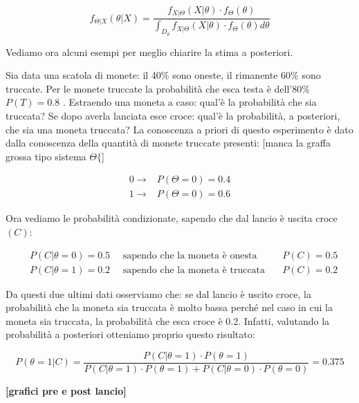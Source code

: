   \[ f_{\Theta|X}(\theta|X)=\frac{f_{X|\Theta}(X|\theta) \cdot f_\Theta(\theta)}{\int_{D_\theta}^{} f_{X|\Theta}(X|\theta) \cdot f_\Theta(\theta) d\theta } \]
  
Vediamo ora alcuni esempi per meglio chiarire la stima a posteriori.

\begin{esempio}
Sia data una scatola di monete: il 40\% sono oneste, il rimanente 60\% sono truccate. Per le monete truccate la probabilità che esca testa è dell'80\% $P(T)=0.8$ . Estraendo una moneta a caso: qual'è la probabilità che sia truccata? Se dopo averla lanciata esce croce: qual'è la probabilità, a posteriori, che sia una moneta truccata?\newline
La conoscenza a priori di questo esperimento è dato dalla conoscenza della quantità di monete truccate presenti:
[manca la graffa grossa tipo sistema $\Theta \{$]

  \begin{align*}
    0 \rightarrow &P(\Theta=0)=0.4 \\ 
    1 \rightarrow &P(\Theta=0)=0.6
  \end{align*}
  
Ora vediamo le probabilità condizionate, sapendo che dal lancio è uscita croce $(C)$:

  \begin{align*}
    &P(C|\theta=0)=0.5 \quad \text{ sapendo che la moneta è onesta}\quad &P(C)=0.5 \\
    &P(C|\theta=1)=0.2 \quad \text{ sapendo che la moneta è truccata}\quad &P(C)=0.2
  \end{align*}
  
Da questi due ultimi dati osserviamo che: se dal lancio è uscito croce, la probabilità che la moneta sia truccata è molto bassa perché nel caso in cui la moneta sia truccata, la probabilità che esca croce è 0.2. Infatti, valutando la probabilità a posteriori otteniamo proprio questo risultato:


    \[ P(\theta=1|C)=\frac{P(C|\theta=1) \cdot P(\theta=1)}{P(C|\theta=1) \cdot P(\theta=1) + P(C|\theta=0) \cdot P(\theta=0)}=0.375 \]

\textbf{[grafici pre e post lancio]}
\end{esempio}

